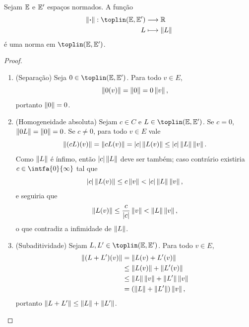 \begin{prop}
Sejam $\E$ e $\E'$ espaços normados. A função
	\begin{align*}
	\func{\nor{\var}}{\toplin(\E,\E')}{\R}{L}{\nor{L}}
	\end{align*}
é uma norma em $\toplin(\E,\E')$.
\end{prop}
\begin{proof}
	\begin{enumerate}
	\item (Separação) Seja $0 \in \toplin(\E,\E')$. Para todo $v \in E$,
	\begin{equation*}
	\nor{0(v)} = \nor{0}=0\nor{v},
	\end{equation*}
portanto $\nor{0}=0$.
	
	\item (Homogeneidade absoluta) Sejam $c \in C$ e $L \in \toplin(\E,\E')$. Se $c=0$, $\nor{0L}=\nor{0}=0$. Se $c \neq 0$, para todo $v \in E$ vale
	\begin{equation*}
	\nor{(cL)(v)} = \nor{cL(v)} = \abs{c}\nor{L(v)} \leq \abs{c}\nor{L}\nor{v}.
	\end{equation*}
Como $\nor{L}$ é ínfimo, então $\abs{c}\nor{L}$ deve ser também; caso contrário existiria $c \in \intfa{0}{\infty}$ tal que
	\begin{equation*}
	\abs{c}\nor{L(v)} \leq c\nor{v} < \abs{c}\nor{L}\nor{v},
	\end{equation*}
e seguiria que
	\begin{equation*}
	\nor{L(v)} \leq \frac{c}{\abs{c}}\nor{v} < \nor{L}\nor{v},
	\end{equation*}
o que contradiz a infimidade de $\nor{L}$.
	
	\item (Subaditividade) Sejam $L,L' \in \toplin(\E,\E')$. Para todo $v \in E$,
	\begin{align*}
	\nor{(L+L')(v)} &= \nor{L(v)+L'(v)} \\
		&\leq \nor{L(v)} + \nor{L'(v)} \\
		&\leq \nor{L}\nor{v} + \nor{L'}\nor{v} \\
		&= (\nor{L}+\nor{L'})\nor{v},
	\end{align*}
portanto $\nor{L+L'} \leq \nor{L}+\nor{L'}$. \qedhere
	\end{enumerate}
\end{proof}












